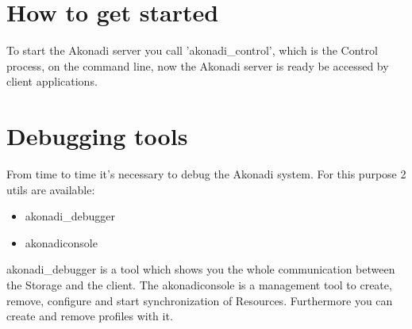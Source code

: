 \documentclass[]{report}
\begin{document}
\section{How to get started}
To start the Akonadi server you call 'akonadi\_control', which is the Control process,
on the command line, now the Akonadi server is ready be accessed by client applications.

\section{Debugging tools}
From time to time it's necessary to debug the Akonadi system. For this purpose 2 utils are
available:
\begin{itemize}
  \item akonadi\_debugger
  \item akonadiconsole
\end{itemize}

akonadi\_debugger is a tool which shows you the whole communication between the Storage and
the client.
The akonadiconsole is a management tool to create, remove, configure and start synchronization
of Resources. Furthermore you can create and remove profiles with it.
\end{document}
